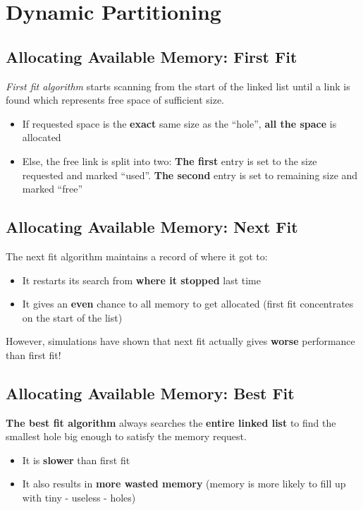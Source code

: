 \documentclass{article}
\begin{document}
\section{Dynamic Partitioning}
\subsection{Allocating Available Memory: First Fit}
\begin{flushleft}
\textit{First fit algorithm} starts scanning from the start of the linked list until a link is found which represents free space of sufficient size.
\begin{itemize}
	\item If requested space is the \textbf{exact} same size as the “hole”, \textbf{all the space} is allocated
	\item Else, the free link is split into two: \textbf{The first} entry is set to the size requested and marked “used”. \textbf{The second} entry is set to remaining size and marked “free”
\end{itemize}
\end{flushleft}

\subsection{Allocating Available Memory: Next Fit}
\begin{flushleft}
The next fit algorithm maintains a record of where it got to:
\begin{itemize}
	\item  It restarts its search from \textbf{where it stopped} last time
	\item It gives an \textbf{even} chance to all memory to get allocated (first fit concentrates on the start of the list) 
\end{itemize}
However, simulations have shown that next fit actually gives \textbf{worse} performance than first fit!
\end{flushleft}

\subsection{Allocating Available Memory: Best Fit}
\begin{flushleft}
\textbf{The best fit algorithm} always searches the \textbf{entire linked list} to find the smallest hole big enough to satisfy the memory request.
\begin{itemize}
	\item It is \textbf{slower} than first fit
	\item It also results in \textbf{more wasted memory} (memory is more likely to fill up with tiny - useless - holes)
\end{itemize}
\end{flushleft}
\end{document}
